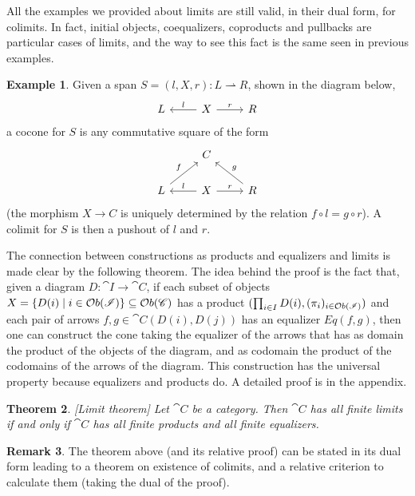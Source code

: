 \documentclass[a4paper, twoside,openright]{report}
\theoremstyle{plain}
\newtheorem{theorem}{Theorem}[section]
\theoremstyle{definition}
\newtheorem{example}[theorem]{Example}
\newtheorem{remark}[theorem]{Remark}
\begin{document}
All the examples we provided about limits are still valid, in their dual form, for colimits. In fact, initial objects, coequalizers, coproducts and pullbacks are particular cases of limits, and the way to see this fact is the same seen in previous examples.

\begin{example}
    Given a span $S = (l, X, r): L \rightharpoonup R$, shown in the diagram below,
    \[
        \begin{tikzcd}
            L & X \arrow[l, "l"swap] \arrow[r, "r"]& R
        \end{tikzcd}
    \]
    a cocone for $S$ is any commutative square of the form
    \[
        \begin{tikzcd}
            & C & \\
            L \arrow[ur, "f"] &
            X \arrow[l, "l"swap] \arrow[r, "r"]&
            R \arrow[ul, "g" swap]
        \end{tikzcd}
    \]
    (the morphism $X \rightarrow C$ is uniquely determined by the relation $f \circ l = g \circ r$).
    A colimit for $S$ is then a pushout of $l$ and $r$.
\end{example}

The connection between constructions as products and equalizers and limits is made clear by the following theorem. The idea behind the proof is the fact that, given a diagram $D : \cat I \rightarrow \cat C$, if each subset of objects $X = \{D(i) \mid i \in \mathcal{O}b(\mathscr{I})\} \subseteq \mathcal{O}b(\mathscr{C})$ has a product $(\prod_{i \in I} D(i), (\pi_i)_{i \in \mathcal{O}b( \mathscr{I})})$ and each pair of arrows $f, g \in \cat C (D(i), D(j))$ has an equalizer $Eq(f, g)$, then one can construct the cone taking the equalizer of the arrows that has as domain the product of the objects of the diagram, and as codomain the product of the codomains of the arrows of the diagram. This construction has the universal property because equalizers and products do. A detailed proof is in the appendix.

\begin{theorem}\label{th:limit}[Limit theorem]
    Let $\cat C$ be a category. Then $\cat C$ has all finite limits if and only if $\cat C$ has all finite products and all finite equalizers.
\end{theorem}

\begin{remark}
    The theorem above (and its relative proof) can be stated in its dual form leading to a theorem on existence of colimits, and a relative criterion to calculate them (taking the dual of the proof).
\end{remark}
\end{document}
